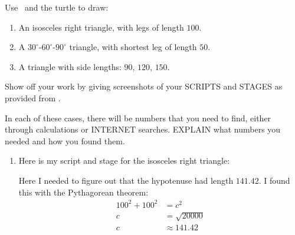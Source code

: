 \documentclass[handout,noauthor,nooutcomes]{ximera}
\begin{document}
\begin{question}
  Use \snap\ and the turtle to draw:
  \begin{enumerate}
  \item An isosceles right triangle, with legs of length $100$.
  \item A $30^\circ$-$60^\circ$-$90^\circ$ triangle, with shortest leg of length $50$.
  \item A triangle with side lengths: $90$, $120$, $150$.
  \end{enumerate}
  Show off your work by giving screenshots of your SCRIPTS and STAGES as
  provided from \snap.

  
  In each of these cases, there will be numbers that you need to find,
  either through calculations or INTERNET searches. EXPLAIN what
  numbers you needed and how you found them.
  
  \begin{freeResponse}
    \begin{enumerate}
    \item Here is my script and stage for the isosceles right
      triangle:
      \begin{center}
        \qquad
      \end{center}
      Here I needed to figure out that the hypotenuse had length
      $141.42$. I found this with the Pythagorean theorem:
      \begin{align*}
      100^2 + 100^2 &= c^2\\
      c &= \sqrt{20000}\\
      c &\approx 141.42
      \end{align*}
      

\end{enumerate}
\end{freeResponse}
\end{question}
\end{document}
